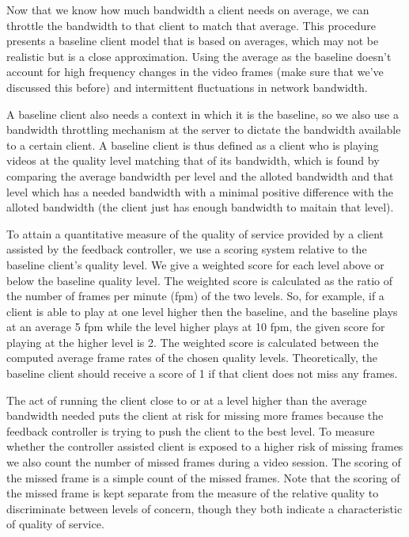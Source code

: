 \documentclass{sig-alternate}
\begin{document}
Now that we know how much bandwidth a client needs on average, we can
throttle the bandwidth to that client to match that average.  This
procedure presents a baseline client model that is based on averages,
which may not be realistic but is a close approximation.  Using the
average as the baseline doesn't account for high frequency changes in
the video frames (make sure that we've discussed this before) and
intermittent fluctuations in network bandwidth.

A baseline client also needs a context in which it is the baseline, so
we also use a bandwidth throttling mechanism \cite{SHAPERD} at the
server to dictate the bandwidth available to a certain client.  A
baseline client is thus defined as a client who is playing videos at
the quality level matching that of its bandwidth, which is found by
comparing the average bandwidth per level and the alloted bandwidth
and that level which has a needed bandwidth with a minimal positive
difference with the alloted bandwidth (the client just has enough
bandwidth to maitain that level).

To attain a quantitative measure of the quality of service provided by
a client assisted by the feedback controller, we use a scoring system
relative to the baseline client's quality level.  We give a weighted
score for each level above or below the baseline quality level.  The
weighted score is calculated as the ratio of the number of frames per
minute (fpm) of the two levels.  So, for example, if a client is able
to play at one level higher then the baseline, and the baseline plays
at an average 5 fpm while the level higher plays at 10 fpm, the given
score for playing at the higher level is 2.  The weighted score is
calculated between the computed average frame rates of the chosen
quality levels.  Theoretically, the baseline client should receive a
score of 1 if that client does not miss any frames.

The act of running the client close to or at a level higher than the
average bandwidth needed puts the client at risk for missing more
frames because the feedback controller is trying to push the client to
the best level.  To measure whether the controller assisted client is
exposed to a higher risk of missing frames we also count the number of
missed frames during a video session.  The scoring of the missed frame
is a simple count of the missed frames.  Note that the scoring of the
missed frame is kept separate from the measure of the relative quality
to discriminate between levels of concern, though they both indicate a
characteristic of quality of service.
\end{document}
